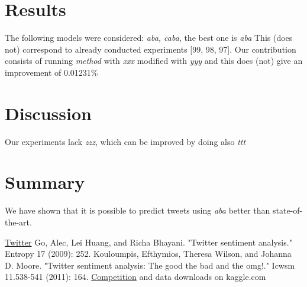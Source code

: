 \documentclass[10pt,conference,compsocconf]{IEEEtran}
\begin{document}
\section{Results}
The following models were considered: {\em aba, caba}, the best one is {\em aba} This (does not) correspond to already conducted experiments [99, 98, 97]. Our contribution consists of running {\em method} with {\em xxx} modified with {\em yyy} and this does (not) give an improvement of 0.01231\%
\section{Discussion}
Our experiments lack {\em zzz}, which can be improved by doing also {\em ttt}
\section{Summary}
We have shown that it is possible to predict tweets using {\em aba} better than state-of-the-art.

\begin{thebibliography}{99}
	 \href{http://twitter.com}{Twitter}
	 Go, Alec, Lei Huang, and Richa Bhayani. "Twitter sentiment analysis." Entropy 17 (2009): 252.
	 Kouloumpis, Efthymios, Theresa Wilson, and Johanna D. Moore. "Twitter sentiment analysis: The good the bad and the omg!." Icwsm 11.538-541 (2011): 164.
	 \href{https://www.kaggle.com/c/epfml17-text/data}{Competition} and data downloads on kaggle.com
\end{thebibliography}
\end{document}
